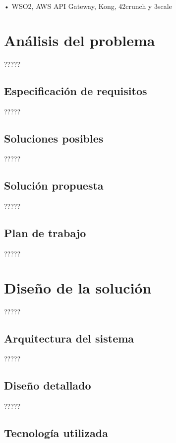 \documentclass[11pt,spanish,listoffigures]{tfgetsinf}
\begin{document}
•	WSO2, AWS API Gateway, Kong, 42crunch y 3scale



\chapter{Análisis del problema}

?????

\section{Especificación de requisitos}

?????

\section{Soluciones posibles}

?????

\section{Solución propuesta}

?????

\section{Plan de trabajo}

?????


\chapter{Diseño de la solución}

?????

\section{Arquitectura del sistema}

?????

\section{Diseño detallado}

?????

\section{Tecnología utilizada}
\end{document}
